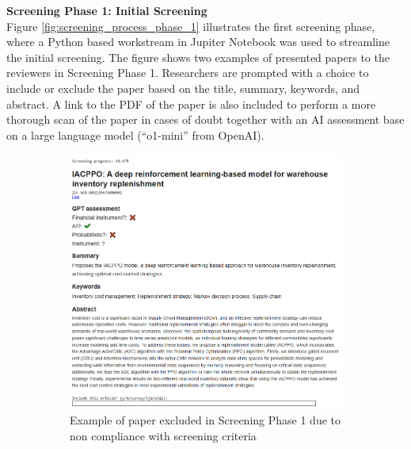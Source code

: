 \textbf{Screening Phase 1: Initial Screening} \\
Figure \ref{fig:screening_process_phase_1} illustrates the first screening phase, where a Python based workstream in Jupiter Notebook was used to streamline the initial screening. The figure shows two examples of presented papers to the reviewers in Screening Phase 1. Researchers are prompted with a choice to include or exclude the paper based on the title, summary, keywords, and abstract. A link to the PDF of the paper is also included to perform a more thorough scan of the paper in cases of doubt together with an AI assessment base on a large language model (“o1-mini” from OpenAI).
\begin{figure}[H]
    \centering
     \begin{subfigure}[b]{0.49\textwidth}
         \centering
         \includegraphics[width=\textwidth]{Images/screening_a.png}
         \caption{Example of paper excluded in Screening Phase 1 due to non compliance with screening criteria}
         \label{fig:screening_phase_1_rejected}
     \end{subfigure}
     \hfill
     \begin{subfigure}[b]{0.49\textwidth}
         \centering

\end{subfigure}
\end{figure}
